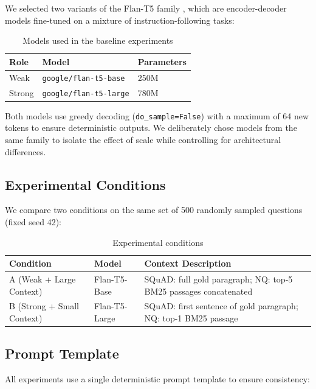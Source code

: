 \documentclass[11pt,a4paper]{article}
\begin{document}
We selected two variants of the Flan-T5 family \cite{chung2022flan}, which are encoder-decoder models fine-tuned on a mixture of instruction-following tasks:

\begin{table}[H]
\centering
\caption{Models used in the baseline experiments}
\label{tab:models}
\begin{tabularx}{0.6\textwidth}{@{} L{2.5cm} X R{2.5cm} @{}}
\toprule
\textbf{Role} & \textbf{Model} & \textbf{Parameters} \\
\midrule
Weak & \texttt{google/flan-t5-base} & 250M \\
Strong & \texttt{google/flan-t5-large} & 780M \\
\bottomrule
\end{tabularx}
\end{table}

Both models use greedy decoding (\texttt{do\_sample=False}) with a maximum of 64 new tokens to ensure deterministic outputs. We deliberately chose models from the same family to isolate the effect of scale while controlling for architectural differences.

\subsection{Experimental Conditions}

We compare two conditions on the same set of 500 randomly sampled questions (fixed seed 42):

\begin{table}[H]
\centering
\caption{Experimental conditions}
\label{tab:conditions}
\begin{tabularx}{\textwidth}{@{} L{3cm} L{3cm} X @{}}
\toprule
\textbf{Condition} & \textbf{Model} & \textbf{Context Description} \\
\midrule
A (Weak + Large Context) & Flan-T5-Base & SQuAD: full gold paragraph; NQ: top-5 BM25 passages concatenated \\
B (Strong + Small Context) & Flan-T5-Large & SQuAD: first sentence of gold paragraph; NQ: top-1 BM25 passage \\
\bottomrule
\end{tabularx}
\end{table}

\subsection{Prompt Template}

All experiments use a single deterministic prompt template to ensure consistency:
\end{document}
